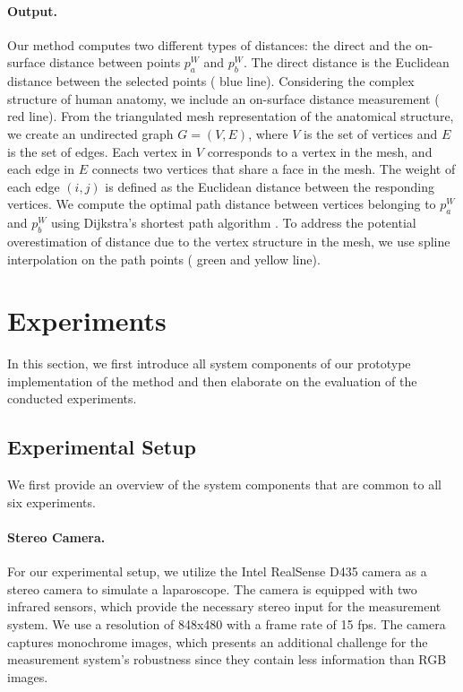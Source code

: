 \documentclass[letterpaper]{article} %
\begin{document}
\paragraph{Output.} Our method computes two different types of distances: the direct and the on-surface distance between points $p_a^{W}$ and $p_b^{W}$. The direct distance is the Euclidean distance between the selected points ( blue line). Considering the complex structure of human anatomy, we include an on-surface distance measurement ( red line). From the triangulated mesh representation of the anatomical structure, we create an undirected graph $G = (V, E)$, where $V$ is the set of vertices and $E$ is the set of edges. Each vertex in $V$ corresponds to a vertex in the mesh, and each edge in $E$ connects two vertices that share a face in the mesh. The weight of each edge $(i, j)$ is defined as the Euclidean distance between the responding vertices. We compute the optimal path distance between vertices belonging to \(p_a^{W}\) and \(p_b^{W}\) using Dijkstra's shortest path algorithm \cite{bodenstedt_image-based_2016}. To address the potential overestimation of distance due to the vertex structure in the mesh, we use spline interpolation on the path points \cite{bodenstedt_image-based_2016} ( green and yellow line).


\section{Experiments}
\label{sec:experimentalsetup}

In this section, we first introduce all system components of our prototype implementation of the method and then elaborate on the evaluation of the conducted experiments.

\subsection{Experimental Setup}

We first provide an overview of the system components that are common to all six experiments.

\paragraph{Stereo Camera.} For our experimental setup, we utilize the Intel RealSense D435 camera as a stereo camera to simulate a laparoscope. The camera is equipped with two infrared sensors, which provide the necessary stereo input for the measurement system. We use a resolution of 848x480 with a frame rate of 15 fps. The camera captures monochrome images, which presents an additional challenge for the measurement system's robustness since they contain less information than RGB images.
\end{document}
